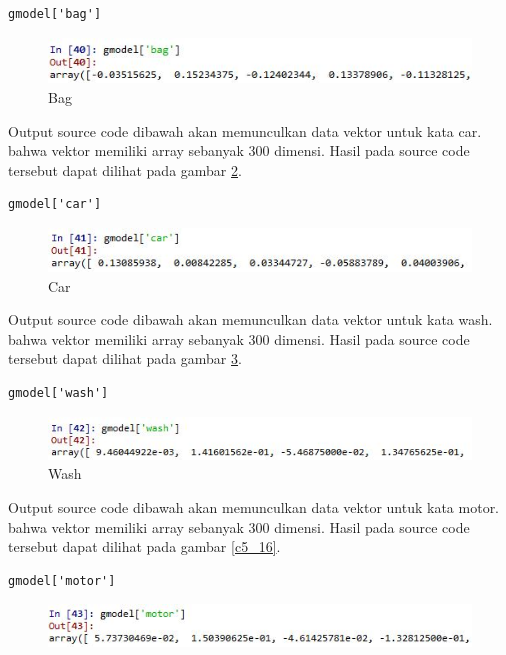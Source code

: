 \begin{enumerate}
\begin{verbatim}
gmodel['bag']
\end{verbatim}
\begin{figure}[!htbp]
	\centerline{\includegraphics[width=1\textwidth]{figures/huda/chapter5/13.JPG}}
	\caption{Bag}
	\label{c5_13}
\end{figure}
\subitem Output source code dibawah akan memunculkan data vektor untuk kata car. bahwa vektor memiliki array sebanyak 300 dimensi. Hasil pada source code tersebut dapat dilihat pada gambar \ref{c5_14}.
\begin{verbatim}
gmodel['car']
\end{verbatim}
\begin{figure}[!htbp]
	\centerline{\includegraphics[width=1\textwidth]{figures/huda/chapter5/14.JPG}}
	\caption{Car}
	\label{c5_14}
\end{figure}
\subitem Output source code dibawah akan memunculkan data vektor untuk kata wash. bahwa vektor memiliki array sebanyak 300 dimensi. Hasil pada source code tersebut dapat dilihat pada gambar \ref{c5_15}.
\begin{verbatim}
gmodel['wash']
\end{verbatim}
\begin{figure}[!htbp]
	\centerline{\includegraphics[width=1\textwidth]{figures/huda/chapter5/15.JPG}}
	\caption{Wash}
	\label{c5_15}
\end{figure}
\subitem Output source code dibawah akan memunculkan data vektor untuk kata motor. bahwa vektor memiliki array sebanyak 300 dimensi. Hasil pada source code tersebut dapat dilihat pada gambar \ref{c5_16}.
\begin{verbatim}
gmodel['motor']
\end{verbatim}
\begin{figure}[!htbp]
	\centerline{\includegraphics[width=1\textwidth]{figures/huda/chapter5/16.JPG}}

\end{figure}
\end{enumerate}
